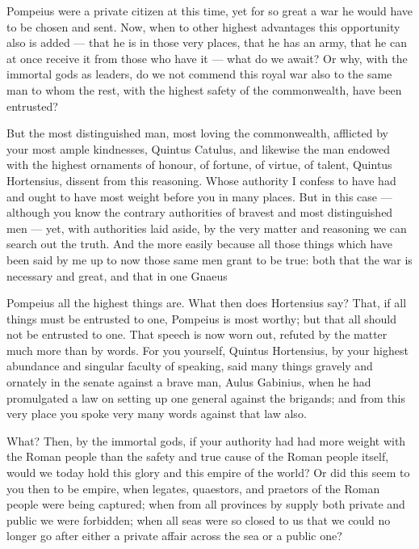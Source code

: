  Pompeius were a private citizen at this time, yet for so great a war he would have to be chosen and sent. Now, when to other highest advantages this opportunity also is added --- that he is in those very places, that he has an army, that he can at once receive it from those who have it --- what do we await? Or why, with the immortal gods as leaders, do we not commend this royal war also to the same man to whom the rest, with the highest safety of the commonwealth, have been entrusted?

 But the most distinguished man, most loving the commonwealth, afflicted by your most ample kindnesses, Quintus Catulus, and likewise the man endowed with the highest ornaments of honour, of fortune, of virtue, of talent, Quintus Hortensius, dissent from this reasoning. Whose authority I confess to have had and ought to have most weight before you in many places. But in this case --- although you know the contrary authorities of bravest and most distinguished men --- yet, with authorities laid aside, by the very matter and reasoning we can search out the truth. And the more easily because all those things which have been said by me up to now those same men grant to be true: both that the war is necessary and great, and that in one Gnaeus

 Pompeius all the highest things are. What then does Hortensius say? That, if all things must be entrusted to one, Pompeius is most worthy; but that all should not be entrusted to one. That speech is now worn out, refuted by the matter much more than by words. For you yourself, Quintus Hortensius, by your highest abundance and singular faculty of speaking, said many things gravely and ornately in the senate against a brave man, Aulus Gabinius, when he had promulgated a law on setting up one general against the brigands; and from this very place you spoke very many words against that law also.

 What? Then, by the immortal gods, if your authority had had more weight with the Roman people than the safety and true cause of the Roman people itself, would we today hold this glory and this empire of the world? Or did this seem to you then to be empire, when legates, quaestors, and praetors of the Roman people were being captured; when from all provinces by supply both private and public we were forbidden; when all seas were so closed to us that we could no longer go after either a private affair across the sea or a public one?

